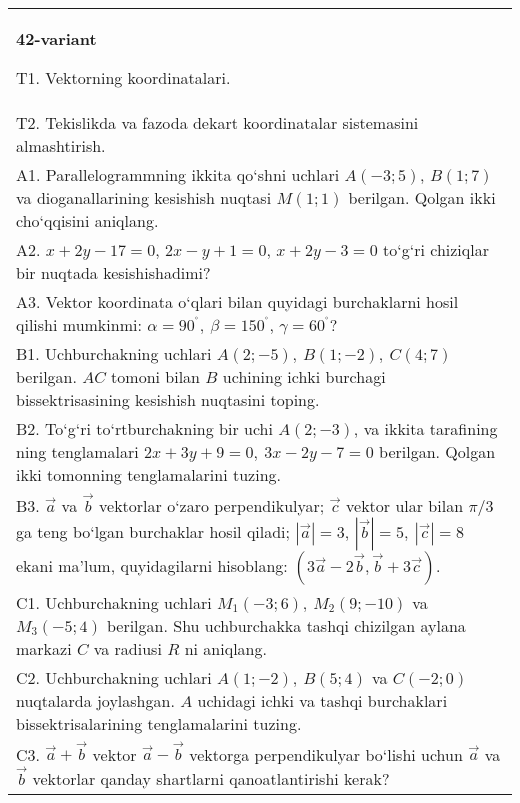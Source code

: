 \documentclass{article}
\begin{document}
\begin{tabular}{m{17cm}}
\textbf{42-variant}
\newline

T1. 
Vektorning koordinatalari.
 \\
T2. Tekislikda va fazoda dekart koordinatalar sistemasini almashtirish.
 \\
A1. 
Parallelogrammning ikkita qo‘shni uchlari $A (-3;5) $, $B (1;7) $
va dioganallarining kesishish nuqtasi $M (1;1)$ berilgan. Qolgan ikki
cho‘qqisini aniqlang.
 \\
A2. 
$x+2y-17=0$, $2x-y+1=0$, $x+2y-3=0$
to‘g‘ri chiziqlar bir nuqtada kesishishadimi?
 \\
A3. 
Vektor koordinata o‘qlari bilan quyidagi burchaklarni hosil qilishi
mumkinmi: $\alpha = 90^{{^\circ}},\ \beta = 150^{{^\circ}}$,
$\gamma = 60^{{^\circ}}?$
 \\
B1. 
Uchburchakning uchlari \(A (2;-5),\ B (1;-2),\ C (4;7) \)
berilgan. $AC$ tomoni bilan $B$ uchining ichki burchagi
bissektrisasining kesishish nuqtasini toping.
 \\
B2. 
To‘g‘ri to‘rtburchakning bir uchi \(A (2;-3) \), va ikkita tarafining
ning tenglamalari \(2x+3y+9=0,\ 3x-2y-7=0\)
berilgan. Qolgan ikki tomonning tenglamalarini tuzing.
 \\
B3. 
$\vec{a}$ va $\vec{b}$ vektorlar o‘zaro perpendikulyar; $\vec{c}$ vektor ular bilan $\pi/3$ ga teng bo‘lgan burchaklar hosil qiladi; $|\vec{a}| = 3$, $|\vec{b}| = 5,\ |\vec{c}| = 8$ ekani ma’lum, quyidagilarni hisoblang:
$\left(3\vec{a} - 2\vec{b},\vec{b} + 3\vec{c} \right) $.
 \\
C1. 
Uchburchakning uchlari \(M_{1} (- 3;6),\ M_{2} (9; - 10) \)
va \(M_{3} (-5;4) \) berilgan. Shu uchburchakka tashqi chizilgan
aylana markazi $C$ va radiusi $R$ ni aniqlang.
 \\
C2. 
Uchburchakning uchlari \(A (1;-2),\ B (5; 4) \) va
\(C (-2;0) \) nuqtalarda joylashgan. $A$ uchidagi ichki va tashqi
burchaklari bissektrisalarining tenglamalarini tuzing.
 \\
C3. 
\(\vec{a} + \vec{b}\) vektor \(\vec{a} - \vec{b}\) vektorga perpendikulyar bo‘lishi uchun \(\vec{a}\) va \(\vec{b}\) vektorlar qanday shartlarni qanoatlantirishi kerak?
 \\

\end{tabular}
\vspace{1cm}
\end{document}

